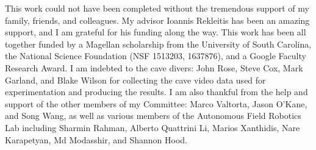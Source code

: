 This work could not have been completed without the tremendous support of my family, friends, and colleagues. My advisor Ioannis Rekleitis has been an amazing support, and I am grateful for his funding along the way. This work has been all together funded by a Magellan scholarship from the University of South Carolina, the National Science Foundation (NSF 1513203, 1637876), and a Google Faculty Research Award. I am indebted to the cave divers:  John Rose, Steve Cox, Mark Garland, and Blake Wilson for collecting the cave video data used for experimentation and producing the results. I am also thankful from the help and support of the other members of my Committee: Marco Valtorta, Jason O'Kane, and Song Wang, as well as various members of the Autonomous Field Robotics Lab including Sharmin Rahman, Alberto Quattrini Li, Marios Xanthidis, Nare Karapetyan, Md Modasshir, and Shannon Hood. 